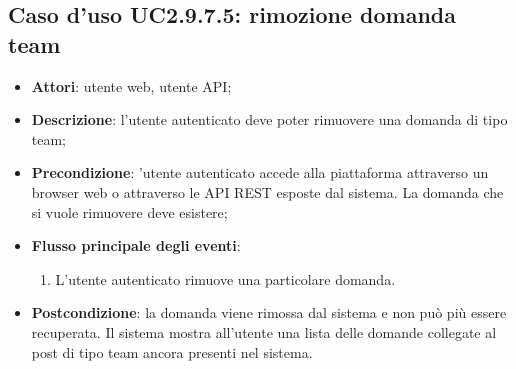 \subsection{Caso d'uso UC2.9.7.5: rimozione domanda team}
\begin{itemize}
\item \textbf{Attori}: utente web, utente API;
\item \textbf{Descrizione}: l'utente autenticato deve poter rimuovere una domanda di tipo team; 
      \item \textbf{Precondizione}: 'utente autenticato accede alla piattaforma attraverso un browser web o attraverso le API REST esposte dal sistema. La domanda che si vuole rimuovere deve esistere;

        \item \textbf{Flusso principale degli eventi}:
          \begin{enumerate}
          \item L'utente autenticato rimuove una particolare domanda.

      \end{enumerate}
    \item \textbf{Postcondizione}: la domanda viene rimossa dal sistema e non può più essere recuperata. Il sistema mostra all'utente una lista delle domande collegate al post di tipo team ancora presenti nel sistema.
  \end{itemize}
\hypertarget{UC2.9.7.6}{}
